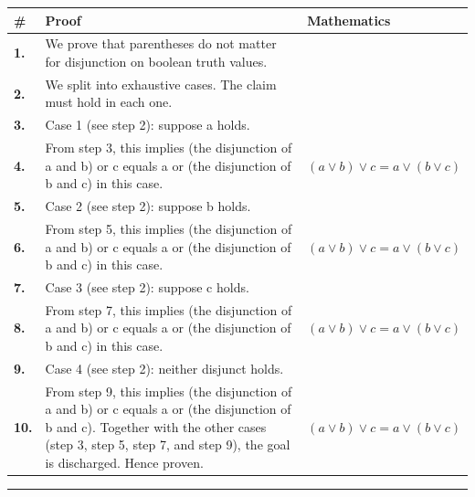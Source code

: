 \documentclass[11pt]{article}
\theoremstyle{definition}
\begin{document}
\begin{tabular}{@{} >{\raggedright\arraybackslash}p{} >{\raggedright\arraybackslash}p{} >{\raggedleft\arraybackslash}p{} @{}}
\textbf{\#} & \textbf{Proof} & \textbf{Mathematics} \\
\midrule
\textbf{1.} & We prove that parentheses do not matter for disjunction on boolean truth values. & \\[0.45em]
\textbf{2.} & We split into exhaustive cases. The claim must hold in each one. & \\[0.45em]
\textbf{3.} & Case 1 (see step 2): suppose a holds. & \\[0.45em]
\textbf{4.} & From step 3, this implies (the disjunction of a and b) or c equals a or (the disjunction of b and c) in this case. & $\displaystyle (a \lor b) \lor c = a \lor (b \lor c)$ \\[0.45em]
\textbf{5.} & Case 2 (see step 2): suppose b holds. & \\[0.45em]
\textbf{6.} & From step 5, this implies (the disjunction of a and b) or c equals a or (the disjunction of b and c) in this case. & $\displaystyle (a \lor b) \lor c = a \lor (b \lor c)$ \\[0.45em]
\textbf{7.} & Case 3 (see step 2): suppose c holds. & \\[0.45em]
\textbf{8.} & From step 7, this implies (the disjunction of a and b) or c equals a or (the disjunction of b and c) in this case. & $\displaystyle (a \lor b) \lor c = a \lor (b \lor c)$ \\[0.45em]
\textbf{9.} & Case 4 (see step 2): neither disjunct holds. & \\[0.45em]
\textbf{10.} & From step 9, this implies (the disjunction of a and b) or c equals a or (the disjunction of b and c). Together with the other cases (step 3, step 5, step 7, and step 9), the goal is discharged. Hence proven. & $\displaystyle (a \lor b) \lor c = a \lor (b \lor c)$ \\[0.45em]
\bottomrule
\end{tabular}
\label{thm:Bool-disjunction-parentheses_do_not_matter}
\par\medskip\hrule
\end{document}
